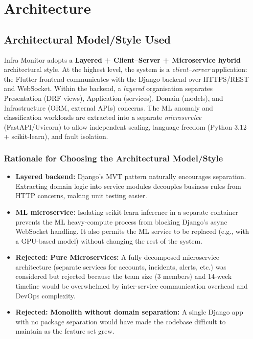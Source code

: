 \chapter{Architecture}\label{ch:arch}

\section{Architectural Model/Style Used}

Infra Monitor adopts a \textbf{Layered + Client--Server + Microservice hybrid}
architectural style.  At the highest level, the system is a \textit{client--server}
application: the Flutter frontend communicates with the Django backend over
HTTPS/REST and WebSocket.  Within the backend, a \textit{layered} organisation
separates Presentation (DRF views), Application (services), Domain (models), and
Infrastructure (ORM, external APIs) concerns.  The ML anomaly and classification
workloads are extracted into a separate \textit{microservice} (FastAPI/Uvicorn)
to allow independent scaling, language freedom (Python 3.12 + scikit-learn), and
fault isolation.

\subsection{Rationale for Choosing the Architectural Model/Style}

\begin{itemize}
  \item \textbf{Layered backend:} Django's MVT pattern naturally encourages
        separation.  Extracting domain logic into service modules decouples
        business rules from HTTP concerns, making unit testing easier.
  \item \textbf{ML microservice:} Isolating scikit-learn inference in a separate
        container prevents the ML heavy-compute process from blocking Django's
        async WebSocket handling.  It also permits the ML service to be replaced
        (e.g., with a GPU-based model) without changing the rest of the system.
  \item \textbf{Rejected: Pure Microservices:} A fully decomposed microservice
        architecture (separate services for accounts, incidents, alerts, etc.)
        was considered but rejected because the team size (3 members) and
        14-week timeline would be overwhelmed by inter-service communication
        overhead and DevOps complexity.
  \item \textbf{Rejected: Monolith without domain separation:} A single Django
        app with no package separation would have made the codebase difficult
        to maintain as the feature set grew.
\end{itemize}

